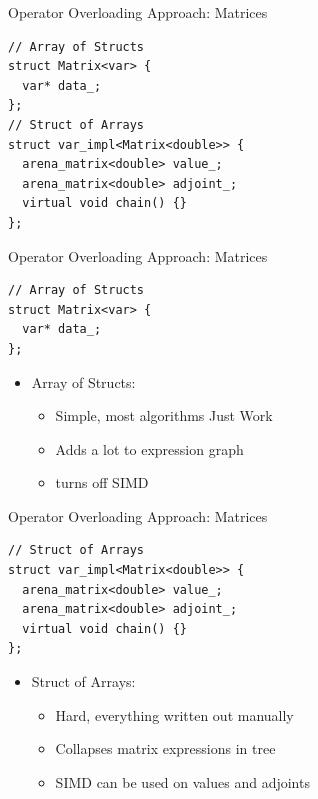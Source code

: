\documentclass[dvipsnames]{beamer}
\begin{document}
\begin{frame}[fragile]{Operator Overloading Approach: Matrices}
\begin{verbatim}
// Array of Structs
struct Matrix<var> {
  var* data_;
};
// Struct of Arrays
struct var_impl<Matrix<double>> {
  arena_matrix<double> value_;
  arena_matrix<double> adjoint_;
  virtual void chain() {}
};
\end{verbatim}
\vspace{-8mm}
\end{frame}
\begin{frame}[fragile]{Operator Overloading Approach: Matrices}
\begin{verbatim}
// Array of Structs
struct Matrix<var> {
  var* data_;
};
\end{verbatim}
\begin{itemize}
    \item Array of Structs:
    \begin{itemize}
        \item Simple, most algorithms Just Work\texttrademark
        \item Adds a lot to expression graph
        \item turns off SIMD
    \end{itemize}
\end{itemize}
\end{frame}
\begin{frame}[fragile]{Operator Overloading Approach: Matrices}
\begin{verbatim}
// Struct of Arrays
struct var_impl<Matrix<double>> {
  arena_matrix<double> value_;
  arena_matrix<double> adjoint_;
  virtual void chain() {}
};
\end{verbatim}
\begin{itemize}
    \item Struct of Arrays:
    \begin{itemize}
        \item Hard, everything written out manually
        \item Collapses matrix expressions in tree
        \item SIMD can be used on values and adjoints
    \end{itemize}
\end{itemize}
\end{frame}
\end{document}
